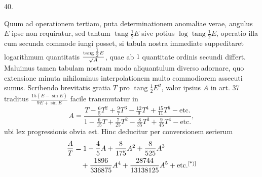 \begin{center}
\hypertarget{native-058-article040}{}40.
\end{center}
Quum ad operationem tertiam, puta determinationem anomaliae verae, angulus $E$ ipse non requiratur, sed tantum $\operatorname{tang}\tfrac{1}{2}E$ sive potius $\log\operatorname{tang}\tfrac{1}{2}E$, operatio illa cum secunda commode iungi posset, si tabula nostra immediate suppeditaret logarithmum quantitatis $\frac{\operatorname{tang}\tfrac{1}{2}E}{\mathord{{}^{}\!\surd}A}$, quae ab $1$ quantitate ordinis secundi differt. Maluimus tamen tabulam nostram modo aliquantulum diverso adornare, quo extensione minuta nihilominus interpolationem multo commodiorem assecuti sumus. Scribendo brevitatis gratia $T$ pro $\operatorname{tang}\tfrac{1}{2}E^2$, valor ipsius $A$ in art. 37 traditus $\frac{15(E-\sin E)}{9E+\sin E}$ facile transmutatur in
\[
A=\frac{T-\tfrac{6}{5}T^2+\tfrac{9}{7}T^3-\tfrac{12}{9}T^4+\tfrac{15}{11}T^5-\text{etc.}}{1-\tfrac{6}{15}T+\tfrac{7}{25}T^2-\tfrac{8}{35}T^3+\tfrac{9}{45}T^4-\text{etc.}},
\]
ubi lex progressionis obvia est. Hinc deducitur per conversionem serierum
\[
\begin{aligned}
\frac{A}{T}&=1-\frac{4}{5}A+\frac{8}{175}A^2+\frac{8}{525}A^3\\
&\quad+\frac{1896}{336875}A^4+\frac{28744}{13138125}A^5+\text{etc.}\mbox{\HistoricalDisplayNoteMark}
\end{aligned}
\]
\noindent\HistoricalDisplayNoteText{Handschriftliche Bemerkung:]
\[
\begin{aligned}
\log\operatorname{hyp}\frac{A}{T}&=-\frac{4}{5}A-\frac{48}{175}A^2-\frac{104}{875}A^3-\cdot\cdot\cdot\\
&=-\frac{4}{5}T+\frac{64}{175}T^2-\frac{8}{35}T^3+\cdot\cdot\cdot
\end{aligned}
\]
\[
\log\frac{A}{T}=-2Am=-2Tm'
\]
\begin{center}
\begin{tabular}{c|c|c@{\hspace{2em}}c|c}
$A$ & $\log m$ & $\log n$ & $T$ & $\log m'$ \\
$0.000$ & $9.23984$ & $9.63778$ & $0.000$ & $9.23984$ \\
$0.010$ & $9.24134$ & $9.63909$ & $0.010$ & $9.23787$ \\
$0.020$ & $9.24284$ & $9.64041$ & $0.020$ & $9.23591$ \\
$0.030$ & $9.24435$ & $9.64172$ & &
\end{tabular}
\end{center}
\[
\begin{gathered}
\operatorname{tang}\tfrac{1}{2}v=M\gamma\operatorname{tang}\tfrac{1}{2}w,\qquad r=\frac{q\sec\tfrac{1}{2}v^2}{N},\\
\log M=Am,\qquad \log N=An.
\end{gathered}
\]
}
